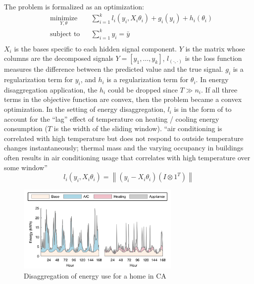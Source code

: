 \documentclass[12pt]{article}
\begin{document}
The problem is formalized as an optimization:
$$
\begin{aligned}
  \label{eq:opt}
  &\underset{Y, \theta}{\text{minimize}} &&\sum_{i = 1}^k {l_i (y_i , X_i \theta_i) + g_i(y_i) + h_i(\theta_i)}\\
  &\text{subject to} &&\sum_{i = 1}^k y_i = \bar{y}\\
\end{aligned}
$$
$X_i$ is the bases specific to each hidden signal component. $Y$ is
the matrix whose columns are the decomposed signals
$Y = [y_1, \dots, y_k]$, $l_(\cdot, \cdot)$ is the loss function
measures the difference between the predicted value and the true
signal. $g_i$ is a regularization term for $y_i$, and $h_i$ is a
regularization term for $\theta_i$. In energy disaggregation
application, the $h_i$ could be dropped since $T \gg n_i$. If all
three terms in the objective function are convex, then the problem
became a convex optimization. In the setting of energy disaggregation,
$l_i$ is in the form of to account for the ``lag'' effect of
temperature on heating / cooling energy consumption ($T$ is the width
of the sliding window). ``air conditioning is correlated with high
temperature but does not respond to outside temperature changes
instantaneously; thermal mass and the varying occupancy in buildings
often results in air conditioning usage that correlates with high
temperature over some window''
\begin{equation}
  \label{eq:loss}
  l_i(y_i, X_i\theta_i) = \left\|(y_i - X_i\theta_i)(I \otimes 1^T)\right\|
\end{equation}
\begin{figure}[h!]
\centering
\includegraphics[width=0.7\textwidth]{images/disagg.png}
\caption{Disaggregation of energy use for a home in CA}
\label{fig:dis}
\end{figure}
\end{document}

